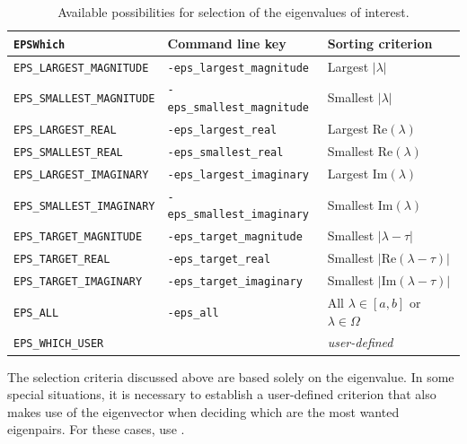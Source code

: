 \begin{table}
\centering
{\small \begin{tabular}{lll}
\texttt{EPSWhich}                  & Command line key                   & Sorting criterion \\\hline
\texttt{EPS\_LARGEST\_MAGNITUDE}   & \texttt{-eps\_largest\_magnitude}  & Largest $|\lambda|$ \\
\texttt{EPS\_SMALLEST\_MAGNITUDE}  & \texttt{-eps\_smallest\_magnitude} & Smallest $|\lambda|$ \\
\texttt{EPS\_LARGEST\_REAL}        & \texttt{-eps\_largest\_real}       & Largest $\mathrm{Re}(\lambda)$ \\
\texttt{EPS\_SMALLEST\_REAL}       & \texttt{-eps\_smallest\_real}      & Smallest $\mathrm{Re}(\lambda)$ \\
\texttt{EPS\_LARGEST\_IMAGINARY}   & \texttt{-eps\_largest\_imaginary}  & Largest $\mathrm{Im}(\lambda)$\footnotemark[1] \\
\texttt{EPS\_SMALLEST\_IMAGINARY}  & \texttt{-eps\_smallest\_imaginary} & Smallest $\mathrm{Im}(\lambda)$\footnotemark[1] \\
\hline
\texttt{EPS\_TARGET\_MAGNITUDE}    & \texttt{-eps\_target\_magnitude}   & Smallest $|\lambda-\tau|$ \\
\texttt{EPS\_TARGET\_REAL}         & \texttt{-eps\_target\_real}        & Smallest $|\mathrm{Re}(\lambda-\tau)|$ \\
\texttt{EPS\_TARGET\_IMAGINARY}    & \texttt{-eps\_target\_imaginary}   & Smallest $|\mathrm{Im}(\lambda-\tau)|$ \\
\hline
\texttt{EPS\_ALL}                  & \texttt{-eps\_all}                 & All $\lambda\in[a,b]$ or $\lambda\in\Omega$\\
\texttt{EPS\_WHICH\_USER}          &                                    & \emph{user-defined} \\\hline
\end{tabular} }
\caption{\label{tab:portion}Available possibilities for selection of the eigenvalues of interest.}
\end{table}


The selection criteria discussed above are based solely on the eigenvalue. In some special situations, it is necessary to establish a user-defined criterion that also makes use of the eigenvector when deciding which are the most wanted eigenpairs. For these cases, use .

